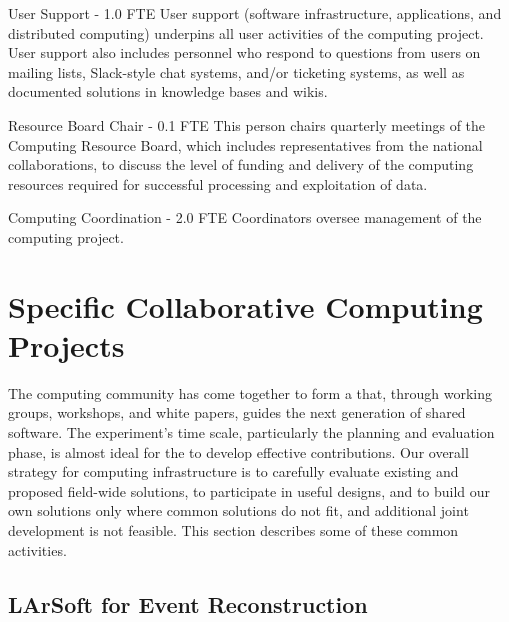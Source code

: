 \begin{description}
\item {User Support - 1.0 FTE}
User support (software infrastructure, applications, and distributed computing) underpins all user activities of the computing project. User support also includes personnel who respond to questions from users on mailing lists, Slack-style chat systems, and/or ticketing systems, as well as documented solutions in knowledge bases and wikis.%

\item {Resource Board Chair - 0.1 FTE}
This person chairs quarterly meetings of the Computing Resource Board, which includes representatives from the national  collaborations, to discuss the level of funding and delivery of the computing resources required for successful processing and exploitation of  data. %

\item {Computing Coordination - 2.0 FTE}
Coordinators oversee management of the computing project. 
\end{description}



\section{Specific Collaborative Computing Projects}
\label{ch:exec-comp-gov-coop}

The  computing community has come together to form a \cite{Alves:2017she} that, through working groups, workshops, and white papers, guides the next generation of shared  software.  %
The  experiment’s time scale, particularly the planning and evaluation phase, is almost ideal for the  to develop effective contributions. Our overall strategy for computing infrastructure is to carefully evaluate existing and proposed field-wide solutions, to participate in useful designs, and to build our own solutions only where common solutions do not fit, and additional joint development is not feasible.   This section describes some of these common activities. 



\subsection{LArSoft for Event Reconstruction}

